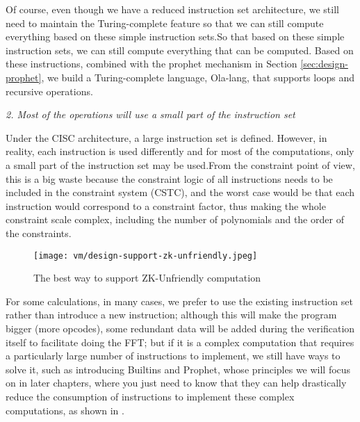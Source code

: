 Of course, even though we have a reduced instruction set architecture, we still need to maintain the Turing-complete feature so that
we can still compute everything based on these simple instruction sets.So that based on these simple instruction sets, we can still
compute everything that can be computed. Based on these instructions, combined with the prophet mechanism in Section \ref{sec:design-prophet}, we build a Turing-complete
language, Ola-lang, that supports loops and recursive operations.

\emph{2. Most of the operations will use a small part of the instruction set}

Under the CISC architecture, a large instruction set is defined. However, in reality, each instruction is used differently and for most
of the computations, only a small part of the instruction set may be used.From the constraint point of view, this is a big waste because
the constraint logic of all instructions needs to be included in the constraint system (CSTC), and the worst case would be that each instruction
would correspond to a constraint factor, thus making the whole constraint scale complex, including the number of polynomials and the order of
the constraints.

\begin{figure}[!ht]
    \centering
    \texttt{[image: vm/design-support-zk-unfriendly.jpeg]}
    \caption{The best way to support ZK-Unfriendly computation}
    \label{fig:desgin-support-zk-unfriendly}
\end{figure}

For some calculations, in many cases, we prefer to use the existing instruction set rather than introduce a new instruction; 
although this will make the program bigger (more opcodes), some redundant data will be added during the verification itself to
facilitate doing the FFT; but if it is a complex computation that requires a particularly large number of instructions to implement, we still
have ways to solve it, such as introducing Builtins and Prophet, whose principles we will focus on in later chapters, where you just need to
know that they can help drastically reduce the consumption of instructions to implement these complex computations, as shown in .

